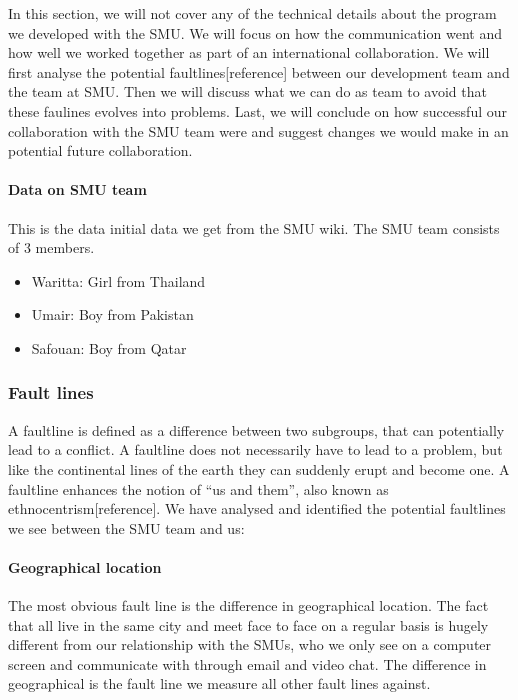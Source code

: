 \documentclass[a4paper,11pt,report]{article}
\begin{document}
In this section, we will not cover any of the technical details about the program we developed with the SMU. We will focus on how the communication went and how well we worked together as part of an international collaboration. We will first analyse the potential faultlines[reference] between our development team and the team at SMU. Then we will discuss what we can do as team to avoid that these faulines evolves into problems. Last, we will conclude on how successful our collaboration with the SMU team were and suggest changes we would make in an potential future collaboration.\\

\paragraph{Data on SMU team}

This is the data initial data we get from the SMU wiki. The SMU team consists of 3 members.\\

\begin{itemize}
\item Waritta: Girl from Thailand
\item Umair: Boy from Pakistan
\item Safouan: Boy from Qatar
\end{itemize}

\subsubsection{Fault lines}
A faultline is defined as a difference between two subgroups, that can potentially lead to a conflict. A faultline does not necessarily have to lead to a problem, but like the continental lines of the earth they can suddenly erupt and become one. A faultline enhances the notion of “us and them”, also known as ethnocentrism[reference]. We have analysed and identified the potential faultlines we see between the SMU team and us:

\paragraph{Geographical location}
The most obvious fault line is the difference in geographical location. The fact that all live in the same city and meet face to face on a regular basis is hugely different from our relationship with the SMUs, who we only see on a computer screen and communicate with through email and video chat. The difference in geographical is the fault line we measure all other fault lines against.
\end{document}

